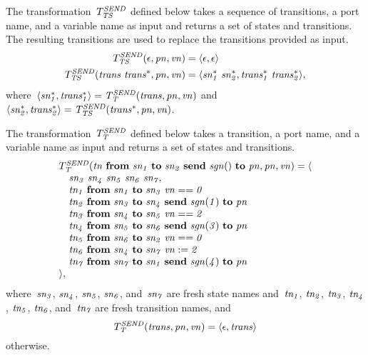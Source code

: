 The transformation~$T_{\it{TS}}^{\it{SEND}}$ defined below takes a sequence of transitions, a port name, and a variable name as input and returns a set of states and transitions.
The resulting transitions are used to replace the transitions provided as input.
%
\begin{align*}
T_{\it{TS}}^{\it{SEND}}(\epsilon, \it{pn}, \it{vn}) & = \langle \epsilon, \epsilon \rangle \\
T_{\it{TS}}^{\it{SEND}}(\it{trans}~\it{trans^*}, \it{pn}, \it{vn}) & = \langle \it{sn^*_1}~\it{sn^*_2}, \it{trans^*_1}~\it{trans^*_2} \rangle,
\end{align*}
where~$\langle \it{sn^*_1}, \it{trans^*_1} \rangle = T_{\it{T}}^{\it{SEND}}(\it{trans}, \it{pn}, \it{vn})$ and~$\langle \it{sn^*_2}, \it{trans^*_2} \rangle = T_{\it{TS}}^{\it{SEND}}(\it{trans^*, \it{pn}, \it{vn}})$.

The transformation~$T_{\it{T}}^{\it{SEND}}$ defined below takes a transition, a port name, and a variable name as input and returns a set of states and transitions.
%
\[
\begin{array}{l}
T_{\it{T}}^{\it{SEND}}(\it{tn}~\textbf{from}~\it{sn_1}~\textbf{to}~\it{sn_2}~\textbf{send}~\it{sgn}()~\textbf{to}~\it{pn}, \it{pn}, \it{vn}) = \langle \\
\quad \it{sn_3}~\it{sn_4}~\it{sn_5}~\it{sn_6}~\it{sn_7}, \\
\quad \it{tn_1}~\textbf{from}~\it{sn_1}~\textbf{to}~\it{sn_3}~\it{vn}==0 \\
\quad \it{tn_2}~\textbf{from}~\it{sn_3}~\textbf{to}~\it{sn_4}~\textbf{send}~\it{sgn}(1)~\textbf{to}~\it{pn} \\
\quad \it{tn_3}~\textbf{from}~\it{sn_4}~\textbf{to}~\it{sn_5}~\it{vn}==2 \\
\quad \it{tn_4}~\textbf{from}~\it{sn_5}~\textbf{to}~\it{sn_6}~\textbf{send}~\it{sgn}(3)~\textbf{to}~\it{pn} \\
\quad \it{tn_5}~\textbf{from}~\it{sn_6}~\textbf{to}~\it{sn_2}~\it{vn}==0 \\
\quad \it{tn_6}~\textbf{from}~\it{sn_4}~\textbf{to}~\it{sn_7}~\it{vn}:=2 \\
\quad \it{tn_7}~\textbf{from}~\it{sn_7}~\textbf{to}~\it{sn_1}~\textbf{send}~\it{sgn}(4)~\textbf{to}~\it{pn} \\
\rangle,
\end{array}
\]
where~$\it{sn_3}$, $\it{sn_4}$, $\it{sn_5}$, $\it{sn_6}$, and~$\it{sn_7}$ are fresh state names and~$\it{tn_1}$, $\it{tn_2}$, $\it{tn_3}$, $\it{tn_4}$, $\it{tn_5}$, $\it{tn_6}$, and~$\it{tn_7}$ are fresh transition names, and
%
\[
T_{\it{T}}^{\it{SEND}}(\it{trans}, \it{pn}, \it{vn}) = \langle \epsilon, \it{trans} \rangle
\]
otherwise.

